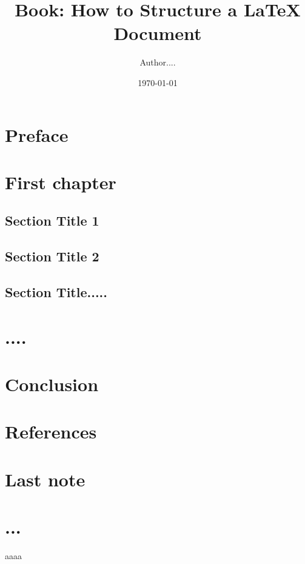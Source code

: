 \documentclass[11pt,a4paper]{book}
\begin{document}
\title{Book: How to Structure a LaTeX Document}
\author{Author....}
\date{\today}

\maketitle

\frontmatter

\chapter{Preface}

\mainmatter
\chapter{First chapter}
\section{Section Title 1}
\section{Section Title 2}

\section{Section Title.....}

\chapter{....}

\chapter{Conclusion}

\chapter*{References}


\backmatter
\chapter{Last note}

\chapter{...}
aaaa
\end{document}
